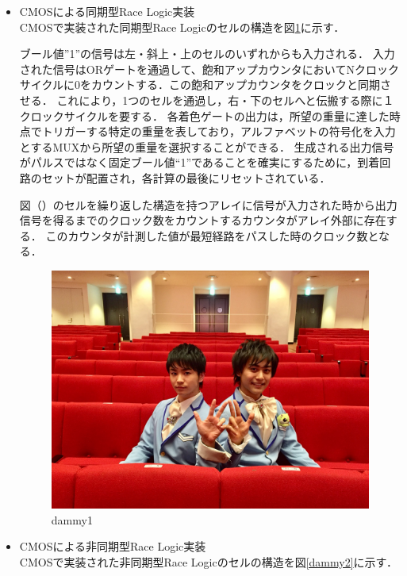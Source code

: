 \begin{itemize}
\item CMOSによる同期型Race Logic実装\\
CMOSで実装された同期型Race Logicのセルの構造を図\ref{dammy1}に示す．

ブール値”1”の信号は左・斜上・上のセルのいずれからも入力される．
入力された信号はORゲートを通過して、飽和アップカウンタにおいてNクロックサイクルに0をカウントする．この飽和アップカウンタをクロックと同期させる．
これにより，1つのセルを通過し，右・下のセルへと伝搬する際に１クロックサイクルを要する．
各着色ゲートの出力は，所望の重量に達した時点でトリガーする特定の重量を表しており，アルファベットの符号化を入力とするMUXから所望の重量を選択することができる．
生成される出力信号がパルスではなく固定ブール値“1”であることを確実にするために，到着回路のセットが配置され，各計算の最後にリセットされている．

図（）のセルを繰り返した構造を持つアレイに信号が入力された時から出力信号を得るまでのクロック数をカウントするカウンタがアレイ外部に存在する．
このカウンタが計測した値が最短経路をパスした時のクロック数となる．
\begin{figure}[t!]
\begin{center}
\includegraphics[keepaspectratio,scale=0.01]{fig/dammy.jpg}
\caption{dammy1}
\label{dammy1}
\end{center}
\end{figure}

\item CMOSによる非同期型Race Logic実装\\
CMOSで実装された非同期型Race Logicのセルの構造を図\ref{dammy2}に示す．


\end{itemize}
